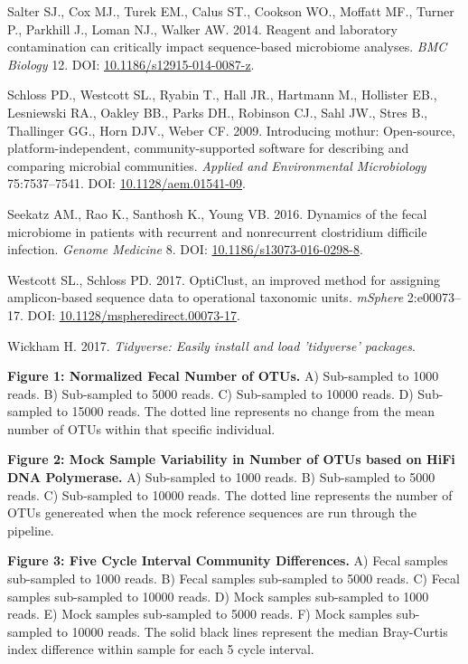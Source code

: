 \documentclass[12pt,]{article}
\begin{document}
\hypertarget{ref-contamination_Salter2014}{}
Salter SJ., Cox MJ., Turek EM., Calus ST., Cookson WO., Moffatt MF.,
Turner P., Parkhill J., Loman NJ., Walker AW. 2014. Reagent and
laboratory contamination can critically impact sequence-based microbiome
analyses. \emph{BMC Biology} 12. DOI:
\href{https://doi.org/10.1186/s12915-014-0087-z}{10.1186/s12915-014-0087-z}.

\hypertarget{ref-mothur_schloss_2009}{}
Schloss PD., Westcott SL., Ryabin T., Hall JR., Hartmann M., Hollister
EB., Lesniewski RA., Oakley BB., Parks DH., Robinson CJ., Sahl JW.,
Stres B., Thallinger GG., Horn DJV., Weber CF. 2009. Introducing mothur:
Open-source, platform-independent, community-supported software for
describing and comparing microbial communities. \emph{Applied and
Environmental Microbiology} 75:7537--7541. DOI:
\href{https://doi.org/10.1128/aem.01541-09}{10.1128/aem.01541-09}.

\hypertarget{ref-erin_seekatz_2016}{}
Seekatz AM., Rao K., Santhosh K., Young VB. 2016. Dynamics of the fecal
microbiome in patients with recurrent and nonrecurrent clostridium
difficile infection. \emph{Genome Medicine} 8. DOI:
\href{https://doi.org/10.1186/s13073-016-0298-8}{10.1186/s13073-016-0298-8}.

\hypertarget{ref-opticlust_Westcott_2017}{}
Westcott SL., Schloss PD. 2017. OptiClust, an improved method for
assigning amplicon-based sequence data to operational taxonomic units.
\emph{mSphere} 2:e00073--17. DOI:
\href{https://doi.org/10.1128/mspheredirect.00073-17}{10.1128/mspheredirect.00073-17}.

\hypertarget{ref-tidyverse_2017}{}
Wickham H. 2017. \emph{Tidyverse: Easily install and load 'tidyverse'
packages}.

\newpage

\textbf{Figure 1: Normalized Fecal Number of OTUs.} A) Sub-sampled to
1000 reads. B) Sub-sampled to 5000 reads. C) Sub-sampled to 10000 reads.
D) Sub-sampled to 15000 reads. The dotted line represents no change from
the mean number of OTUs within that specific individual.

\textbf{Figure 2: Mock Sample Variability in Number of OTUs based on
HiFi DNA Polymerase.} A) Sub-sampled to 1000 reads. B) Sub-sampled to
5000 reads. C) Sub-sampled to 10000 reads. The dotted line represents
the number of OTUs genereated when the mock reference sequences are run
through the pipeline.

\textbf{Figure 3: Five Cycle Interval Community Differences.} A) Fecal
samples sub-sampled to 1000 reads. B) Fecal samples sub-sampled to 5000
reads. C) Fecal samples sub-sampled to 10000 reads. D) Mock samples
sub-sampled to 1000 reads. E) Mock samples sub-sampled to 5000 reads. F)
Mock samples sub-sampled to 10000 reads. The solid black lines represent
the median Bray-Curtis index difference within sample for each 5 cycle
interval.
\end{document}
